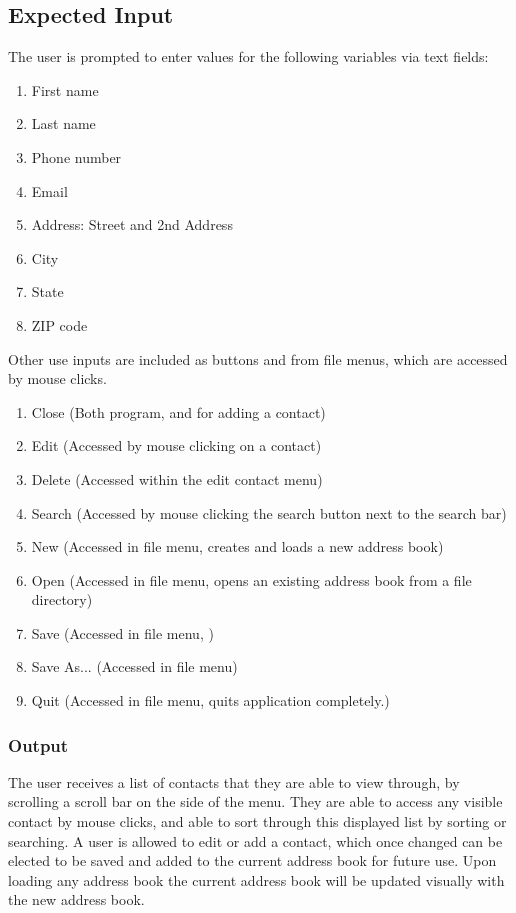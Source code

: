 \documentclass[a4paper, 11pt]{article}
\begin{document}
\subsection{Expected Input}
The user is prompted to enter values for the following variables via text fields:
\begin{enumerate}[nolistsep]
	\setlength\itemsep{.1em}
	\item First name
	\item Last name
	\item Phone number
	\item Email
	\item Address: Street and 2nd Address
	\item City
	\item State
	\item ZIP code
\end{enumerate}
Other use inputs are included as buttons and from file menus, which are accessed by mouse clicks.
\begin{enumerate}[nolistsep]
	\setlength\itemsep{.1em}
	\item Close (Both program, and for adding a contact)
	\item Edit (Accessed by mouse clicking on a contact)
	\item Delete (Accessed within the edit contact menu)
	\item Search (Accessed by mouse clicking the search button next to the search bar)
	\item New (Accessed in file menu, creates and loads a new address book)
	\item Open (Accessed in file menu, opens an existing address book from a file directory)
	\item Save (Accessed in file menu, )
	\item Save As... (Accessed in file menu)
	\item Quit (Accessed in file menu, quits application completely.)
\end{enumerate}
\subsubsection{Output}
The user receives a list of contacts that they are able to view through, by scrolling a scroll bar on the side of the menu. They are able to access any visible contact by mouse clicks, and able to sort through this displayed list by sorting or searching. A user is allowed to edit or add a contact, which once changed can be elected to be saved and added to the current address book for future use. Upon loading any address book the current address book will be updated visually with the new address book.
\end{document}
